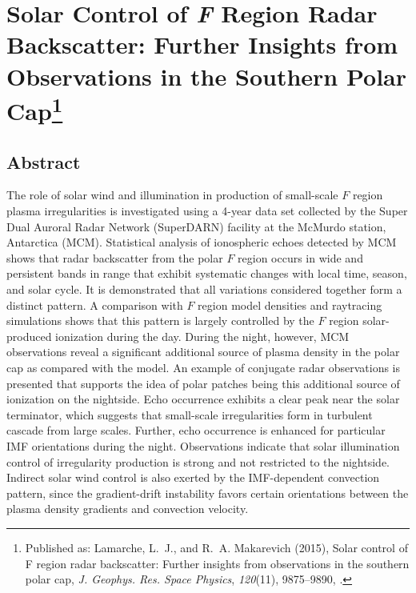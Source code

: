 
\chapter[Solar Control of \textit{F} Region Radar Backscatter: Further Insights from Observations in the Southern Polar Cap]{Solar Control of \textit{F} Region Radar Backscatter: Further Insights from Observations in the Southern Polar Cap\footnote{Published as: {Lamarche}, L.~J., and R.~A. {Makarevich} (2015), Solar control of {F} region radar backscatter: Further insights from observations in the southern polar cap, \textit{J. Geophys. Res. Space Physics}, \textit{120}(11), 9875--9890, .}}

\label{sec:paper1}



\section{Abstract}
The role of solar wind and illumination in production of small-scale \(F\) region plasma irregularities is investigated using a 4-year data set collected by the Super Dual Auroral Radar Network (SuperDARN) facility at the McMurdo station, Antarctica (MCM). Statistical analysis of ionospheric echoes detected by MCM shows that radar backscatter from the polar \(F\) region occurs in wide and persistent bands in range that exhibit systematic changes with local time, season, and solar cycle. It is demonstrated that all variations considered together form a distinct pattern. A comparison with \(F\) region model densities and raytracing simulations shows that this pattern is largely controlled by the \(F\) region solar-produced ionization during the day. During the night, however, MCM observations reveal a significant additional source of plasma density in the polar cap as compared with the model. An example of conjugate radar observations is presented that supports the idea of polar patches being this additional source of ionization on the nightside. Echo occurrence exhibits a clear peak near the solar terminator, which suggests that small-scale irregularities form in turbulent cascade from large scales. Further, echo occurrence is enhanced for particular IMF orientations during the night. Observations indicate that solar illumination control of irregularity production is strong and not restricted to the nightside. Indirect solar wind control is also exerted by the IMF-dependent convection pattern, since the gradient-drift instability favors certain orientations between the plasma density gradients and convection velocity.


